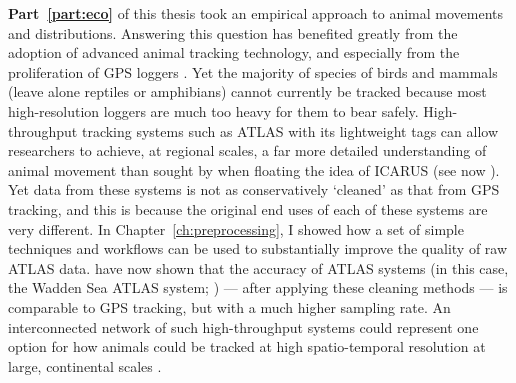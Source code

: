 \textbf{Part~\ref{part:eco}} of this thesis took an empirical approach to animal movements and distributions.
Answering this question has benefited greatly from the adoption of advanced animal tracking technology, and especially from the proliferation of GPS loggers \citep{cagnacci2010}.
Yet the majority of species of birds and mammals (leave alone reptiles or amphibians) cannot currently be tracked because most high-resolution loggers are much too heavy for them to bear safely.
High-throughput tracking systems such as ATLAS with its lightweight tags can allow researchers to achieve, at regional scales, a far more detailed understanding of animal movement than sought by \textcite{wikelski2007} when floating the idea of ICARUS (see now \cite{jetz2022}).
Yet data from these systems is not as conservatively `cleaned' as that from GPS tracking, and this is because the original end uses of each of these systems are very different.
In Chapter~\ref{ch:preprocessing}, I showed how a set of simple techniques and workflows can be used to substantially improve the quality of raw ATLAS data.
\textcite[]{beardsworth2022mee} have now shown that the accuracy of ATLAS systems (in this case, the Wadden Sea ATLAS system; \cite{bijleveld2021}) --- after applying these cleaning methods --- is comparable to GPS tracking, but with a much higher sampling rate.
An interconnected network of such high-throughput systems could represent one option for how animals could be tracked at high spatio-temporal resolution at large, continental scales \citep{nathan2022}.

